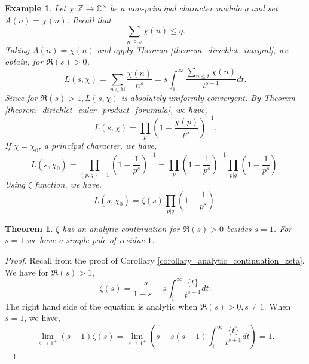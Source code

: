 \documentclass{article}
\newtheorem{theorem}{Theorem} [section]
\newtheorem{example}{Example}[section]
\newcommand{\N}[0]{\mathbb{N}}
\newcommand{\Z}[0]{\mathbb{Z}}
\newcommand{\C}[0]{\mathbb{C}}
\begin{document}
\begin{example}
  \label{example_analytic_continuation_L}
  Let $\chi:\Z\to\C^\times$ be a non-principal character modulo $q$ and set $A(n) = \chi(n)$. 
  Recall that 
  \begin{equation*}
    \sum_{n\leq x}\chi(n)\leq q.
  \end{equation*}
  Taking $A(n) = \chi(n)$ and apply Theorem \ref{theorem_dirichlet_integral}, we obtain, for $\Re(s)>0$,
  \begin{equation*}
    L(s,\chi) = \sum_{n\in\N}{\frac {\chi(n)} {n^s}} = s\int_1^\infty {\frac {\sum_{n\leq t}\chi(n)} {t^{s+1}}}dt.
  \end{equation*}
  Since for $\Re(s)>1,L(s,\chi)$ is absolutely uniformly convergent. By Theorem \ref{theorem_dirichlet_euler_product_forumula}, we have,
  \begin{equation*}
    L(s,\chi) = \prod_{p}\left(1-{\frac {\chi(p)} {p^s}}\right)^{-1}.
  \end{equation*}
  If $\chi = \chi_0$, a principal character, we have, 
  \begin{equation*}
    L(s,\chi_0) = \prod_{(p,q) = 1}\left(1-{\frac 1 {p^{s}}}\right)^{-1} = \prod_p\left(1-{\frac 1 {p^s}}\right)^{-1}\prod_{p|q}\left(1-{\frac 1 {p^s}}\right).
  \end{equation*}
  Using $\zeta$ function, we have,
  \begin{equation*}
    L(s,\chi_0) = \zeta(s)\prod_{p|q}\left(1-{\frac 1 {p^s}}\right).
  \end{equation*}
\end{example}

\begin{theorem}
  \label{theorem_analytic_continuation_zeta}
  $\zeta$ has an analytic continuation for $\Re(s)>0$ besides $s=1$. For $s=1$ we have a simple pole of residue $1$.
\end{theorem}

\begin{proof}
  Recall from the proof of Corollary \ref{corollary_analytic_continuation_zeta}. We have for $\Re(s)>1$,
  \begin{equation*}
    \zeta(s) = {\frac {-s} {1-s}}-s\int_1^\infty {\frac {\{t\}} {t^{s+1}}}dt.
  \end{equation*}
  The right hand side of the equation is analytic when $\Re(s)>0,s\not=1$.
  When $s=1$, we have, 
  \begin{equation*}
    \lim_{s\to1^+}(s-1)\zeta(s) = \lim_{s\to1^+}\left(s-s(s-1)\int_1^\infty {\frac {\{t\}} {t^{s+1}}}dt\right) = 1.
  \end{equation*}
\end{proof}
\end{document}
